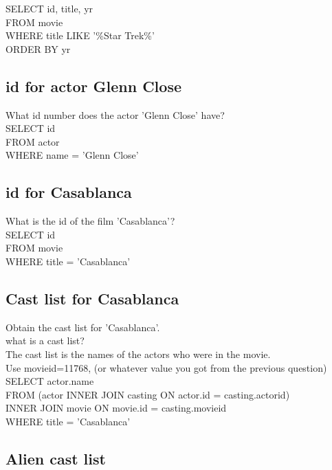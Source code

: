 \documentclass[10pt, oneside]{article}
\begin{document}
SELECT id, title, yr \\
FROM movie \\
WHERE title LIKE '\%Star Trek\%'\\
ORDER BY yr\\

\subsection{id for actor Glenn Close}

What id number does the actor 'Glenn Close' have?\\ 

SELECT id \\
FROM actor\\
WHERE name = 'Glenn Close'\\

\subsection{id for Casablanca}

What is the id of the film 'Casablanca'?\\

SELECT id\\
FROM movie\\
WHERE title = 'Casablanca'\\

\subsection{Cast list for Casablanca}

Obtain the cast list for 'Casablanca'.\\

what is a cast list?\\
The cast list is the names of the actors who were in the movie.\\

Use movieid=11768, (or whatever value you got from the previous question)\\

SELECT actor.name\\
FROM (actor INNER JOIN casting ON actor.id = casting.actorid) \\
INNER JOIN movie ON movie.id = casting.movieid\\
WHERE title = 'Casablanca'\\

\subsection{Alien cast list}
\end{document}
